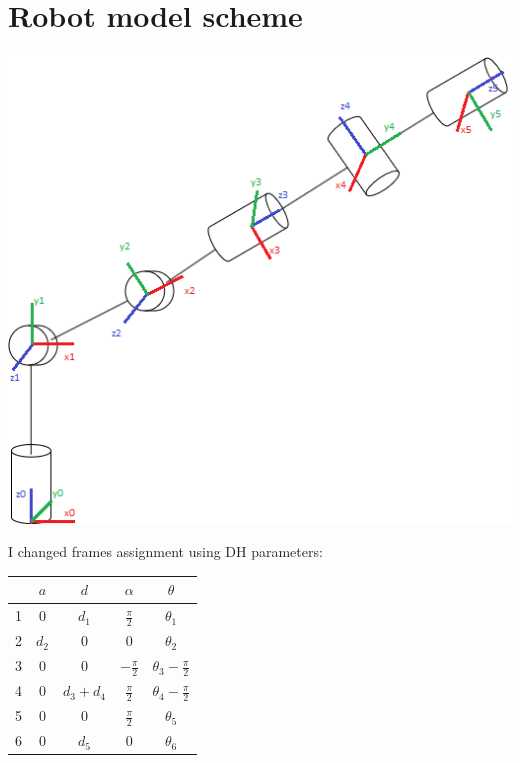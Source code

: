 \section*{Robot model scheme}

\includegraphics[width=\linewidth]{sections/manipulator_structure.png}

I changed frames assignment using DH parameters:

\begin{tabular}{ |c|c|c|c|c| }
    \hline
     & $a$ & $d$ & $\alpha$ & $\theta$ \\
    \hline
    1 & 0 & $d_1$ & $\frac{\pi}{2}$ & $\theta_1$ \\
    \hline
    2 & $d_2$ & 0 & 0 & $\theta_2$ \\
    \hline
    3 & 0 & 0 & $-\frac{\pi}{2}$ & $\theta_3 - \frac{\pi}{2}$ \\
    \hline
    4 & 0 & $d_3 + d_4$ & $\frac{\pi}{2}$ & $\theta_4 - \frac{\pi}{2}$ \\
    \hline
    5 & 0 & 0 & $\frac{\pi}{2}$ & $\theta_5$ \\
    \hline
    6 & 0 & $d_5$ & 0 & $\theta_6$ \\
    \hline
\end{tabular}